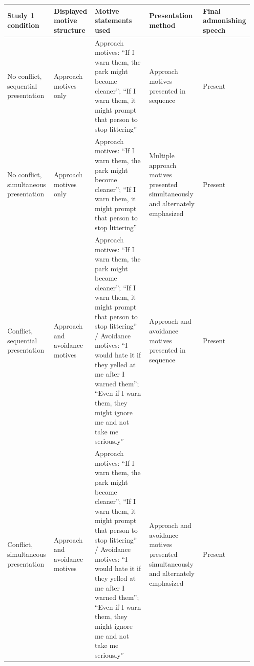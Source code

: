\documentclass[
]{article}
\newcounter{none} %
\begin{document}
{\def\LTcaptype{none} %
\begin{longtable}[]{@{}
  >{\raggedright\arraybackslash}p{}
  >{\raggedright\arraybackslash}p{}
  >{\raggedright\arraybackslash}p{}
  >{\raggedright\arraybackslash}p{}
  >{\raggedright\arraybackslash}p{}@{}}
\toprule\noalign{}
\begin{minipage}[b]{\linewidth}\raggedright
Study 1 condition
\end{minipage} & \begin{minipage}[b]{\linewidth}\raggedright
Displayed motive structure
\end{minipage} & \begin{minipage}[b]{\linewidth}\raggedright
Motive statements used
\end{minipage} & \begin{minipage}[b]{\linewidth}\raggedright
Presentation method
\end{minipage} & \begin{minipage}[b]{\linewidth}\raggedright
Final admonishing speech
\end{minipage} \\
\midrule\noalign{}
\endhead
\bottomrule\noalign{}
\endlastfoot
No conflict, sequential presentation & Approach motives only & Approach
motives: ``If I warn them, the park might become cleaner''; ``If I warn
them, it might prompt that person to stop littering'' & Approach motives
presented in sequence & Present \\
No conflict, simultaneous presentation & Approach motives only &
Approach motives: ``If I warn them, the park might become cleaner'';
``If I warn them, it might prompt that person to stop littering'' &
Multiple approach motives presented simultaneously and alternately
emphasized & Present \\
Conflict, sequential presentation & Approach and avoidance motives &
Approach motives: ``If I warn them, the park might become cleaner'';
``If I warn them, it might prompt that person to stop littering'' /
Avoidance motives: ``I would hate it if they yelled at me after I warned
them''; ``Even if I warn them, they might ignore me and not take me
seriously'' & Approach and avoidance motives presented in sequence &
Present \\
Conflict, simultaneous presentation & Approach and avoidance motives &
Approach motives: ``If I warn them, the park might become cleaner'';
``If I warn them, it might prompt that person to stop littering'' /
Avoidance motives: ``I would hate it if they yelled at me after I warned
them''; ``Even if I warn them, they might ignore me and not take me
seriously'' & Approach and avoidance motives presented simultaneously
and alternately emphasized & Present \\
\end{longtable}
}
\end{document}
